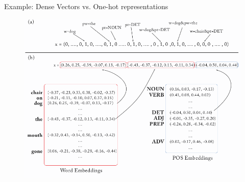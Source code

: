 \documentclass[handout]{beamer}
\begin{document}
\begin{frame}{Example: Dense Vectors vs. One-hot representations}




\begin{figure}[htb]
	\centering
	 \includegraphics[scale=0.35]{pics/denseonehot.png}
\end{figure}


\end{frame}
\end{document}

